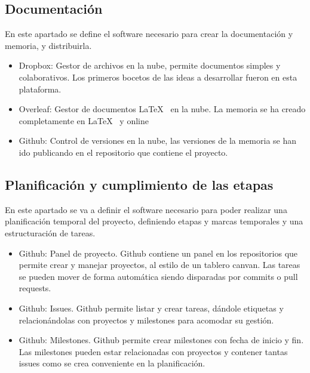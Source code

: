 \subsection{Documentación}
En este apartado se define el software necesario para crear la documentación y memoria, y distribuirla.
\begin{itemize}
    \item Dropbox: Gestor de archivos en la nube, permite documentos simples y colaborativos. Los primeros bocetos de las ideas a desarrollar fueron en esta plataforma.
    \item Overleaf: Gestor de documentos \LaTeX~ en la nube. La memoria se ha creado completamente en \LaTeX~ y online
    \item Github: Control de versiones en la nube, las versiones de la memoria se han ido publicando en el repositorio que contiene el proyecto.
\end{itemize}
\subsection{Planificación y cumplimiento de las etapas}
En este apartado se va a definir el software necesario para poder realizar una planificación temporal del proyecto, definiendo etapas y marcas temporales y una estructuración de tareas.
\begin{itemize}
    \item Github: Panel de proyecto. Github contiene un panel en los repositorios que permite crear y manejar proyectos, al estilo de un tablero canvan. Las tareas se pueden mover de forma automática siendo disparadas por commits o pull requests.
    \item Github: Issues. Github permite listar y crear tareas, dándole etiquetas y relacionándolas con proyectos y milestones para acomodar su gestión.
    \item Github: Milestones. Github permite crear milestones con fecha de inicio y fin. Las milestones pueden estar relacionadas con proyectos y contener tantas issues como se crea conveniente en la planificación. 
\end{itemize}
